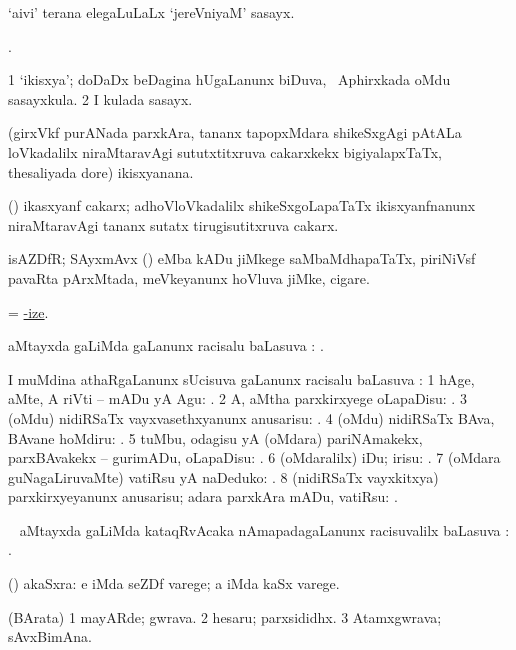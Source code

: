 \bentry
{}
\gl{\nA}
\bmng
`aivi' terana elegaLuLaLx `jereVniyaM' sasayx. 
\emng
\eentry

\bentry
{}
\gl{\saMkiSx}
\bmng
{}. 
\emng
\eentry

\bentry
{}
\gl{\nA}
\bmng
\bnum
\num{1} `ikisxya'; doDaDx beDagina hUgaLanunx biDuva, \da\ Aphirxkada oMdu sasayxkula. 
\num{2} I kulada sasayx. 
\enum
\emng
\eentry

\bentry
{}
\gl{\gu}
\bmng
(girxVkf purANada parxkAra, tananx tapopxMdara shikeSxgAgi pAtALa loVkadalilx niraMtaravAgi sututxtitxruva cakarxkekx bigiyalapxTaTx, thesaliyada dore) ikisxyanana. 
\emng
\eentry

\bentry
{}
\gl{\nA}
\bmng
(\girxVpu) ikasxyanf cakarx; adhoVloVkadalilx shikeSxgoLapaTaTx ikisxyanfnanunx niraMtaravAgi tananx sutatx tirugisutitxruva cakarx. 
\emng
\eentry

\bentry
{}
\gl{\nA}
\bmng
isAZDfR; SAyxmAvx () eMba kADu jiMkege saMbaMdhapaTaTx, piriNiVsf pavaRta pArxMtada, meVkeyanunx hoVluva jiMke, cigare. 
\emng
\eentry

\bentry
{}
\gl{\uparx}
\bmng
=  \hyperlink{hyp-ize}{-ize}. 
\emng
\eentry

\bentry
{}
\gl{\uparx}
\bmng
{} aMtayxda \kirx gaLiMda \nA gaLanunx racisalu baLasuva \uparx: . 
\emng
\eentry

\bentry
{}
\gl{\uparx}
\bmng
I muMdina athaRgaLanunx sUcisuva \kirx gaLanunx racisalu baLasuva \uparx: 
\bnum
\num{1} hAge, aMte, A riVti -- mADu yA Agu: . 
\num{2} A, aMtha parxkirxyege oLapaDisu: . 
\num{3} (oMdu) nidiRSaTx vayxvasethxyanunx anusarisu: . 
\num{4} (oMdu) nidiRSaTx BAva, BAvane hoMdiru: . 
\num{5} tuMbu, odagisu yA (oMdara) pariNAmakekx, parxBAvakekx -- gurimADu, oLapaDisu: . 
\num{6} (oMdaralilx) iDu; irisu: . 
\num{7} (oMdara guNagaLiruvaMte) vatiRsu yA naDeduko: . 
\num{8} (nidiRSaTx vayxkitxya) parxkirxyeyanunx anusarisu; adara parxkAra mADu, vatiRsu: . 
\enum
\emng
\eentry

\bentry
{}
\gl{\uparx}
\bmng
\nA\  aMtayxda \kirx gaLiMda kataqRvAcaka nAmapadagaLanunx racisuvalilx baLasuva \uparx: . 
\emng
\eentry

\bentry
{}
\gl{\nA}
\bmng
(\pArxparx)  akaSxra:  e iMda seZDf varege; a iMda kaSx varege. 
\emng
\eentry

\bentry
{}
\gl{\nA}
\bmng
(BArata) 
\bnum
\num{1} mayARde; gwrava. 
\num{2} hesaru; parxsididhx. 
\num{3} Atamxgwrava; sAvxBimAna. 
\enum
\emng
\eentry


%

